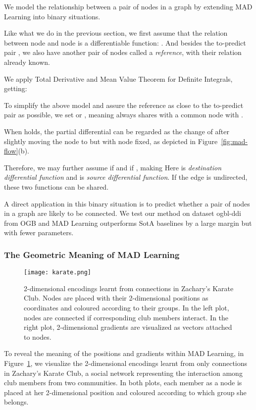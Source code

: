 \documentclass{article}
\begin{document}
We model the relationship between a pair of nodes in a
graph by extending MAD Learning into binary situations.

Like what we do in the previous section, we first assume that the
relation  between node  and node  is a differentiable
function: .
And besides the to-predict pair , we also have another pair of
nodes  called a \emph{reference}, with their relation
 already known.

We apply Total Derivative and Mean Value Theorem for Definite Integrals,
getting:



To simplify the above model and assure the reference 
as close to the to-predict pair  as possible, we set
 or , meaning  always shares with a
common node with .

When  holds, the partial differential
 can be regarded as the
change of  after slightly moving the node  to 
but with node  fixed, as depicted in Figure~\ref{fig:mad-flow}(b).

Therefore, we may further assume
 if 
and  if
, making 
Here  is \emph{destination differential function}
and  is \emph{source differential function}.
If the edge is undirected, these two functions can be shared.

A direct application in this binary situation is to predict
whether a pair of nodes in a graph are likely to be connected.
We test our method on dataset ogbl-ddi from OGB and MAD Learning
outperforms SotA baselines by a large margin but with fewer parameters.

\hypertarget{the-geometric-meaning-of-mad-learning}{\subsubsection{The Geometric Meaning of MAD Learning}\label{sssec:the-geometric-meaning-of-mad-learning}}

\begin{figure}
\centering
\texttt{[image: karate.png]}
\caption{
  2-dimensional encodings learnt from connections in Zachary's Karate
  Club. Nodes are placed with their 2-dimensional positions as coordinates
  and coloured according to their groups. In the left plot, nodes are
  connected if corresponding club members interact. In the right plot,
  2-dimensional gradients are visualized as vectors attached to nodes.
}
\label{fig:karate}
\end{figure}

To reveal the meaning of the positions and gradients within MAD
Learning, in Figure~\ref{fig:karate}, we visualize the 2-dimensional
encodings learnt from only connections in Zachary's Karate Club,
a social network representing the interaction among club members from
two communities. In both plots, each member as a node is placed at
her 2-dimensional position and coloured according to which
group she belongs.
\end{document}
